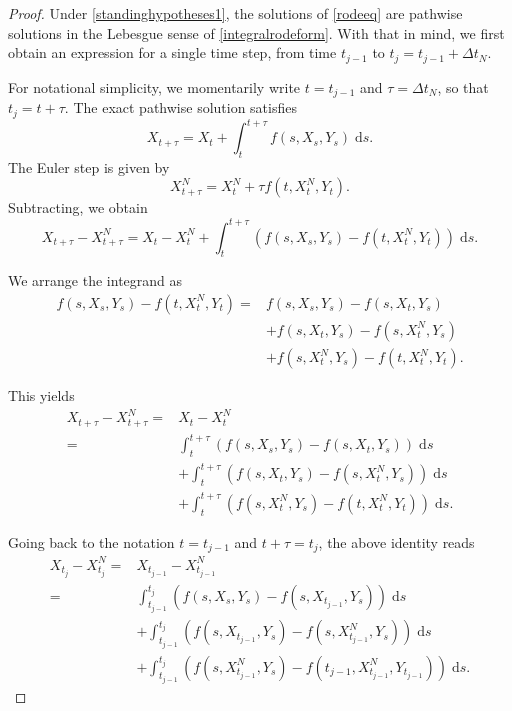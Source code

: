 \documentclass[reqno,12pt]{amsart}
\theoremstyle{plain}%
\theoremstyle{definition}
\begin{document}
\begin{proof}
    Under \cref{standinghypotheses1}, the solutions of \eqref{rodeeq} are pathwise solutions in the Lebesgue sense of \eqref{integralrodeform}. With that in mind, we first obtain an expression for a single time step, from time $t_{j-1}$ to $t_j = t_{j-1} + \Delta t_N$.
    
    For notational simplicity, we momentarily write $t = t_{j-1}$ and $\tau = \Delta t_N$, so that $t_j = t + \tau$. The exact pathwise solution satisfies
    $$
    X_{t + \tau} = X_t + \int_t^{t + \tau} f(s, X_s, Y_s) \;\mathrm{d}s.
    $$
    The Euler step is given by
    $$
    X_{t+\tau}^N = X_t^N + \tau f(t, X_t^N, Y_t).
    $$
    Subtracting, we obtain
    $$
    X_{t + \tau} - X_{t + \tau}^N = X_t - X_t^N + \int_t^{t + \tau} \left( f(s, X_s, Y_s) - f(t, X_t^N, Y_t) \right)\;\mathrm{d}s.
    $$

    We arrange the integrand as
    \begin{align*}
    f(s, X_s, Y_s) - f(t, X_t^N, Y_t) = & f(s, X_s, Y_s) - f(s, X_t, Y_s) \\ 
    & + f(s, X_t, Y_s) - f(s, X_t^N, Y_s) \\
    & + f(s, X_t^N, Y_s) - f(t, X_t^N, Y_t).
    \end{align*}

    This yields
    \begin{align*}
        X_{t + \tau} - X_{t + \tau}^N  = & X_t - X_t^N \\
        = &  \int_t^{t + \tau} \left( f(s, X_s, Y_s) - f(s, X_t, Y_s) \right)\;\mathrm{d}s \\ 
        & + \int_t^{t + \tau} \left( f(s, X_t, Y_s) - f(s, X_t^N, Y_s) \right)\;\mathrm{d}s \\
        & + \int_t^{t + \tau} \left( f(s, X_t^N, Y_s) - f(t, X_t^N, Y_t) \right)\;\mathrm{d}s.
    \end{align*}

    Going back to the notation $t = t_{j-1}$ and $t + \tau = t_j$, the above identity reads
    \begin{equation}
        \label{singlestep}
        \begin{aligned}
            X_{t_j} - X_{t_j}^N  = & X_{t_{j-1}} - X_{t_{j-1}}^N \\
            = &  \int_{t_{j-1}}^{t_j} \left( f(s, X_s, Y_s) - f(s, X_{t_{j-1}}, Y_s) \right)\;\mathrm{d}s \\ 
            & + \int_{t_{j-1}}^{t_j} \left( f(s, X_{t_{j-1}}, Y_s) - f(s, X_{t_{j-1}}^N, Y_s) \right)\;\mathrm{d}s \\
            & + \int_{t_{j-1}}^{t_j} \left( f(s, X_{t_{j-1}}^N, Y_s) - f(t_{j-1}, X_{t_{j-1}}^N, Y_{t_{j-1}}) \right)\;\mathrm{d}s.
        \end{aligned}
    \end{equation}


\end{proof}
\end{document}
